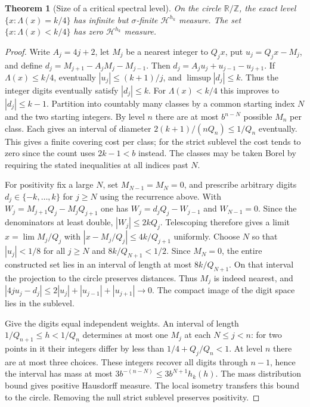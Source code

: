 \documentclass[11pt]{article}
\newtheorem{theorem}{Theorem}
\theoremstyle{definition}
\theoremstyle{remark}
\newcommand{\R}{\mathbb{R}}
\newcommand{\Z}{\mathbb{Z}}
\newcommand{\Lam}{\Lambda}
\begin{document}
\begin{theorem}[Size of a critical spectral level]\label{thm:gauge}
On the circle $\R/\Z$, the exact level $\{x:\Lam(x)=k/4\}$ has
infinite but $\sigma$-finite $\mathcal H^{h_k}$ measure.
The set $\{x:\Lam(x)<k/4\}$ has zero $\mathcal H^{h_k}$ measure.
\end{theorem}
\begin{proof}
Write $A_j=4j+2$, let $M_j$ be a nearest integer to $Q_jx$, put
$u_j=Q_jx-M_j$, and define $d_j=M_{j+1}-A_jM_j-M_{j-1}$.
Then $d_j=A_ju_j+u_{j-1}-u_{j+1}$.
If $\Lam(x)\le k/4$, eventually $|u_j|\le (k+1)/j$, and
$\limsup |d_j|\le k$. Thus the integer digits eventually satisfy
$|d_j|\le k$. For $\Lam(x)<k/4$ this improves to $|d_j|\le k-1$.
Partition into countably many classes by a common starting index $N$
and the two starting integers. By level $n$ there are at most
$b^{n-N}$ possible $M_n$ per class. Each gives an interval of diameter
$2(k+1)/(nQ_n)\le1/Q_n$ eventually. This gives a finite covering
cost per class; for the strict sublevel the cost tends to zero since
the count uses $2k-1<b$ instead. The classes may be taken Borel
by requiring the stated inequalities at all indices past $N$.

For positivity fix a large $N$, set $M_{N-1}=M_N=0$, and prescribe
arbitrary digits $d_j\in\{-k,\ldots,k\}$ for $j\ge N$ using the
recurrence above. With $W_j=M_{j+1}Q_j-M_jQ_{j+1}$ one has
$W_j=d_j Q_j-W_{j-1}$ and $W_{N-1}=0$. Since the denominators at
least double, $|W_j|\le2kQ_j$. Telescoping therefore gives a limit
$x=\lim M_j/Q_j$ with $|x-M_j/Q_j|\le4k/Q_{j+1}$ uniformly.
Choose $N$ so that $|u_j|<1/8$ for all $j\ge N$ and
$8k/Q_{N+1}<1/2$. Since $M_N=0$, the entire constructed set
lies in an interval of length at most $8k/Q_{N+1}$. On that
interval the projection to the circle preserves distances.
Thus $M_j$ is indeed nearest, and
$|4ju_j-d_j|\le2|u_j|+|u_{j-1}|+|u_{j+1}|\to0$.
The compact image of the digit space lies in the sublevel.

Give the digits equal independent weights. An interval of length
$1/Q_{n+1}\le h<1/Q_n$ determines at most one $M_j$ at each
$N\le j<n$: for two points in it their integers differ by less
than $1/4+Q_j/Q_n<1$. At level $n$ there are at most three choices.
These integers recover all digits through $n-1$, hence the interval
has mass at most $3b^{-(n-N)}\le3b^{N+1}h_k(h)$.
The mass distribution bound gives positive Hausdorff measure.
The local isometry transfers this bound to the circle.
Removing the null strict sublevel preserves positivity.


\end{proof}
\end{document}
